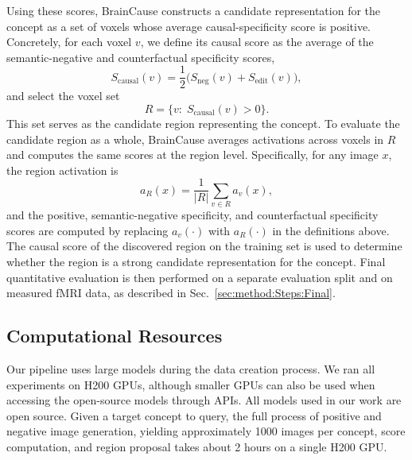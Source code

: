 \documentclass{article}
\begin{document}
Using these scores, BrainCause constructs a candidate representation for the concept as a set of voxels whose average causal-specificity score is positive. Concretely, for each voxel \(v\), we define its causal score as the average of the semantic-negative and counterfactual specificity scores,
\[
S_{\mathrm{causal}}(v)=\frac{1}{2}\Big(S_{\mathrm{neg}}(v)+S_{\mathrm{edit}}(v)\Big),
\]
and select the voxel set
\[
R=\{v:\; S_{\mathrm{causal}}(v)>0\}.
\]
This set serves as the candidate region representing the concept. To evaluate the candidate region as a whole, BrainCause averages activations across voxels in \(R\) and computes the same scores at the region level. Specifically, for any image \(x\), the region activation is
\[
a_R(x)=\frac{1}{|R|}\sum_{v\in R} a_v(x),
\]
and the positive, semantic-negative specificity, and counterfactual specificity scores are computed by replacing \(a_v(\cdot)\) with \(a_R(\cdot)\) in the definitions above. The causal score of the discovered region on the training set is used to determine whether the region is a strong candidate representation for the concept. Final quantitative evaluation is then performed on a separate evaluation split and on measured fMRI data, as described in Sec.~\ref{sec:method:Steps:Final}.



\subsection{Computational Resources}
\label{sec_sup:resources}

Our pipeline uses large models during the data creation process. We ran all experiments on H200 GPUs, although smaller GPUs can also be used when accessing the open-source models through APIs. All models used in our work are open source. Given a target concept to query, the full process of positive and negative image generation, yielding approximately 1000 images per concept, score computation, and region proposal takes about 2 hours on a single H200 GPU.




% 
\end{document}
